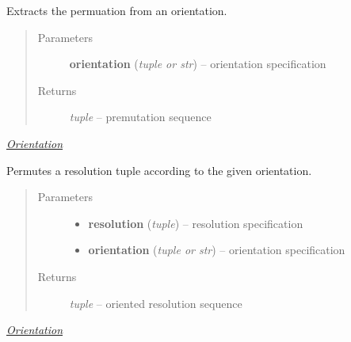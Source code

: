 \documentclass[letterpaper,10pt,english]{sphinxmanual}
\begin{document}
\begin{fulllineitems}
\label{api/ClearMap.Alignment:ClearMap.Alignment.Resampling.orientationToPermuation}
Extracts the permuation from an orientation.
\begin{quote}\begin{description}
\item[{Parameters}] \leavevmode
\textbf{orientation} (\emph{tuple or str}) --
orientation specification

\item[{Returns}] \leavevmode
\emph{tuple} --
premutation sequence

\end{description}\end{quote}




{\hyperref[api/ClearMap.Alignment:orientation]{\emph{Orientation}}}



\end{fulllineitems}


\begin{fulllineitems}
\label{api/ClearMap.Alignment:ClearMap.Alignment.Resampling.orientResolution}
Permutes a resolution tuple according to the given orientation.
\begin{quote}\begin{description}
\item[{Parameters}] \leavevmode\begin{itemize}
\item {} 
\textbf{resolution} (\emph{tuple}) --
resolution specification

\item {} 
\textbf{orientation} (\emph{tuple or str}) --
orientation specification

\end{itemize}

\item[{Returns}] \leavevmode
\emph{tuple} --
oriented resolution sequence

\end{description}\end{quote}




{\hyperref[api/ClearMap.Alignment:orientation]{\emph{Orientation}}}



\end{fulllineitems}
\end{document}
